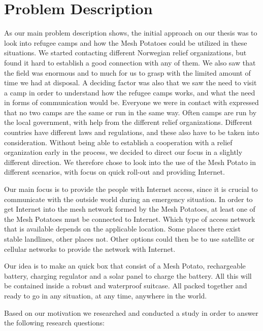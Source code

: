 \section{Problem Description}
As our main problem description shows, the initial approach on our thesis was to look into refugee camps and how the Mesh Potatoes could be utilized in these situations. We started contacting different Norwegian relief organizations, but found it hard to establish a good connection with any of them. We also saw that the field was enormous and to much for us to grasp with the limited amount of time we had at disposal. A deciding factor was also that we saw the need to visit a camp in order to understand how the refugee camps works, and what the need in forms of communication would be. Everyone we were in contact with expressed that no two camps are the same or run in the same way. Often camps are run by the local government, with help from the different relief organizations. Different countries have different laws and regulations, and these also have to be taken into consideration. Without being able to establish a cooperation with a relief organization early in the process, we decided to direct our focus in a slightly different direction. We therefore chose to look into the use of the Mesh Potato in different scenarios, with focus on quick roll-out and providing Internet.

Our main focus is to provide the people with Internet access, since it is crucial to communicate with the outside world during an emergency situation. In order to get Internet into the mesh network formed by the Mesh Potatoes, at least one of the Mesh Potatoes must be connected to Internet. Which type of access network that is available depends on the applicable location. Some places there exist stable landlines, other places not. Other options could then be to use satellite or cellular networks to provide the network with Internet.  

Our idea is to make an \gls{quick} box that consist of a Mesh Potato, rechargeable battery, charging regulator and a solar panel to charge the battery. All this will be contained inside a robust and waterproof suitcase. All packed together and ready to go in any situation, at any time, anywhere in the world. 

Based on our motivation we researched and conducted a study in order to answer the following research questions: 

